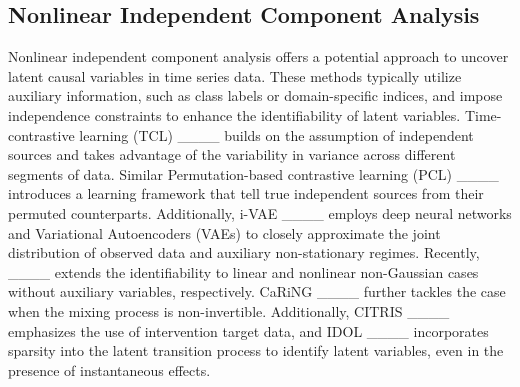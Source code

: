 \subsection{Nonlinear Independent Component Analysis}
Nonlinear independent component analysis offers a potential approach to uncover latent causal variables in time series data. These methods typically utilize auxiliary information, such as class labels or domain-specific indices, and impose independence constraints to enhance the identifiability of latent variables. Time-contrastive learning (TCL) ____ builds on the assumption of independent sources and takes advantage of the variability in variance across different segments of data. Similar Permutation-based contrastive learning (PCL) ____ introduces a learning framework that tell true independent sources from their permuted counterparts. Additionally, i-VAE ____ employs deep neural networks and Variational Autoencoders (VAEs) to closely approximate the joint distribution of observed data and auxiliary non-stationary regimes. Recently, ____ extends the identifiability to linear and nonlinear non-Gaussian cases without auxiliary variables, respectively. CaRiNG ____ further tackles the case when the mixing process is non-invertible. Additionally, CITRIS ____ emphasizes the use of intervention target data, and IDOL ____ incorporates sparsity into the latent transition process to identify latent variables, even in the presence of instantaneous effects.

\vspace{-0.3cm}